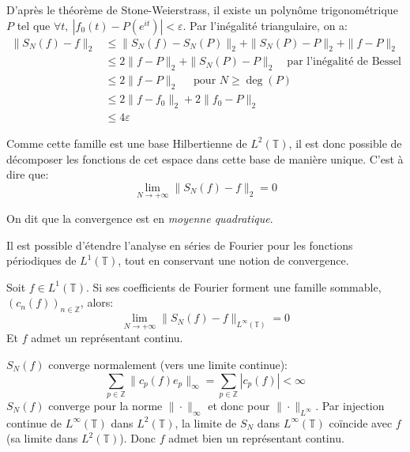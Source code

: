 \begin{myproof}
				D'après le théorème de Stone-Weierstrass, il existe un polynôme trigonométrique $P$ tel que $\forall t,  ~ |f_0(t) - P(e^{it})| < \varepsilon $.
				Par l'inégalité triangulaire, on a:
				\begin{align*}
					\| S_N(f) -f \|_2 &\leqslant \|S_N(f) - S_N(P)\|_2 + \| S_N(P) - P \|_2 + \| f- P \|_2 \\
				&	\leqslant 2 \| f - P\|_2 + \| S_N(P) - P\|_2 \quad \text{par l'inégalité de Bessel} \\
				& \leqslant 2 \| f - P\|_2 \quad \text{ pour } N\geqslant \deg(P) \\
				& \leqslant 2 \| f - f_0\|_2 + 2 \| f_0- P\|_2 \\
				& \leqslant 4 \varepsilon
				\end{align*}
				\cqfd
				
			\end{myproof}
			
		Comme cette famille est une base Hilbertienne de $L^2(\mathbb{T})$, il est donc possible de décomposer les fonctions de cet espace dans cette base de manière unique. C'est à dire que:
				$$ \lim_{N\to +\infty} \|S_N(f) -f \|_2 = 0 $$
				
		On dit que la convergence est en \textit{moyenne quadratique}.

	Il est possible d'étendre l'analyse en séries de Fourier pour les fonctions périodiques de $L^1(\mathbb{T})$, tout en conservant une notion de convergence. 
	
	\begin{mythm}
		Soit $f \in L^1(\mathbb{T})$. Si ses coefficients de Fourier forment une famille sommable, $(c_n(f))_{n\in\mathbb{Z}} $, alors: 
		$$ \lim_{N\to +\infty} \|S_N(f) -f \|_{L^\infty(\mathbb{T})} = 0 $$ 
		Et $f$ admet un représentant continu. 

	\end{mythm}
			
	\begin{myproof}

		$S_N(f)$ converge normalement (vers une limite continue): 
		$$ \sum_{p \in \mathbb{Z}} \|c_p(f)e_p\|_\infty = \sum_{p \in \mathbb{Z}} |c_p(f)| < \infty $$
		$S_N(f)$ converge pour la norme $\| \cdot \|_\infty $ et donc pour $\| \cdot \|_{L^{\infty}} $.
		Par injection continue de $L^\infty(\mathbb{T})$ dans $L^2(\mathbb{T})$, la limite de $S_N$ dans $L^\infty(\mathbb{T})$ coïncide avec $f$ (sa limite dans $L^2(\mathbb{T})$). Donc $f$ admet bien un représentant continu. 
		
		\cqfd
	\end{myproof}
	
